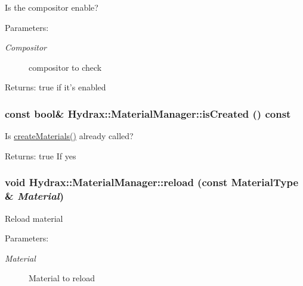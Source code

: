 \begin{CompactItemize}
Is the compositor enable? \begin{Desc}
\item[Parameters:]
\begin{description}
\item[{\em Compositor}]compositor to check \end{description}
\end{Desc}
\begin{Desc}
\item[Returns:]true if it's enabled \end{Desc}
\hypertarget{class_hydrax_1_1_material_manager_b723890a6e4e198c1db2cf19dbe8be87}{
\subsubsection[{isCreated}]{\setlength{\rightskip}{0pt plus 5cm}const bool\& Hydrax::MaterialManager::isCreated () const}}
\label{class_hydrax_1_1_material_manager_b723890a6e4e198c1db2cf19dbe8be87}


Is \hyperlink{class_hydrax_1_1_material_manager_6aa7b0a92b824348577d506f7bcf581b}{createMaterials()} already called? \begin{Desc}
\item[Returns:]true If yes \end{Desc}
\hypertarget{class_hydrax_1_1_material_manager_2961836553f7a30a8baffb9e82f7216e}{
\subsubsection[{reload}]{\setlength{\rightskip}{0pt plus 5cm}void Hydrax::MaterialManager::reload (const {\bf MaterialType} \& {\em Material})}}
\label{class_hydrax_1_1_material_manager_2961836553f7a30a8baffb9e82f7216e}


Reload material \begin{Desc}
\item[Parameters:]
\begin{description}
\item[{\em Material}]Material to reload \end{description}
\end{Desc}
\hypertarget{class_hydrax_1_1_material_manager_160d27bd9ff0fac665ce5ce7c4e013e9}{
}
\end{CompactItemize}
